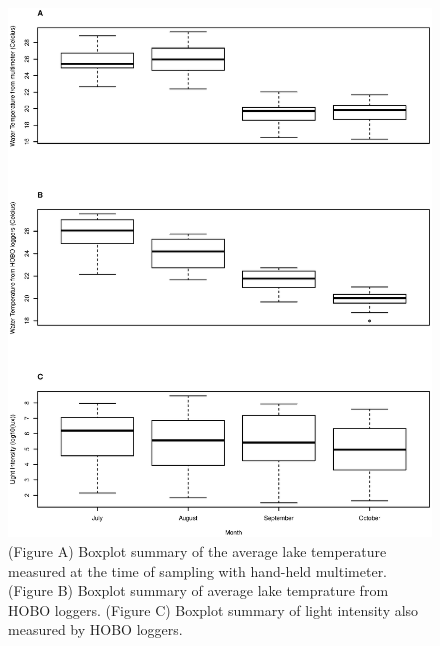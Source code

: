\begin{figure}
\includegraphics[width=\textwidth]{figures/hobo}
\caption{
(Figure A) Boxplot summary of the average lake temperature measured at the time of sampling with hand-held multimeter.
(Figure B) Boxplot summary of average lake temprature from HOBO loggers. 
(Figure C) Boxplot summary of light intensity also measured by HOBO loggers.
} 
\label{fig:hobo}
\end{figure}



